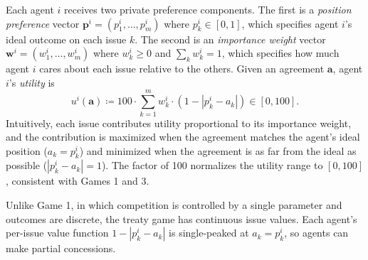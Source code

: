 Each agent $i$ receives two private preference components.
The first is a \emph{position preference} vector $\bm{p}^{i} = (p^{i}_{1}, \dots, p^{i}_{m})$ where $p^{i}_{k} \in [0,1]$, which specifies agent $i$'s ideal outcome on each issue $k$.
The second is an \emph{importance weight} vector $\bm{w}^{i} = (w^{i}_{1}, \dots, w^{i}_{m})$ where $w^{i}_{k} \geq 0$ and $\sum_{k} w^{i}_{k} = 1$, which specifies how much agent $i$ cares about each issue relative to the others.
Given an agreement $\bm{a}$, agent $i$'s \emph{utility} is
\begin{equation}
    u^i(\bm{a}) \coloneqq 100 \cdot \sum_{k=1}^{m} w^{i}_{k} \cdot (1 - |p^{i}_{k} - a_k|) \in [0,100].
\end{equation}
Intuitively, each issue contributes utility proportional to its importance weight, and the contribution is maximized when the agreement matches the agent's ideal position ($a_k = p^{i}_{k}$) and minimized when the agreement is as far from the ideal as possible ($|p^{i}_{k} - a_k| = 1$).
The factor of 100 normalizes the utility range to $[0, 100]$, consistent with Games 1 and 3.

Unlike Game 1, in which competition is controlled by a single parameter and outcomes are discrete, the treaty game has continuous issue values.
Each agent's per-issue value function $1 - |p^i_k - a_k|$ is single-peaked at $a_k = p^i_k$, so agents can make partial concessions.

